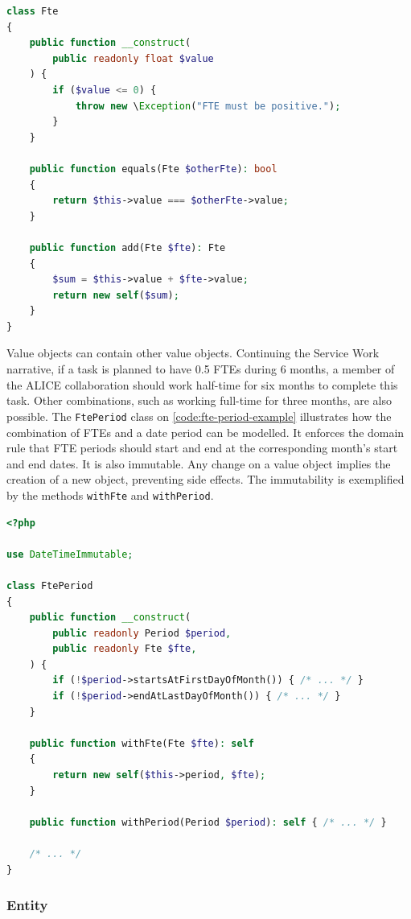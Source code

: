 \begin{lstlisting}[language=PHP,label={code:fte-example},caption={Value object to model the domain concept of FTE.}]
class Fte
{
	public function __construct(
		public readonly float $value
	) {
		if ($value <= 0) {
			throw new \Exception("FTE must be positive.");
		}		
	}

	public function equals(Fte $otherFte): bool
	{
		return $this->value === $otherFte->value;
	}

	public function add(Fte $fte): Fte
	{
		$sum = $this->value + $fte->value;
		return new self($sum);
	}
}
\end{lstlisting}

Value objects can contain other value objects. Continuing the Service Work narrative, if a task is planned to have 0.5 FTEs during 6 months, a member of the ALICE collaboration should work half-time for six months to complete this task. Other combinations, such as working full-time for three months, are also possible. The \texttt{FtePeriod} class on \autoref{code:fte-period-example} illustrates how the combination of FTEs and a date period can be modelled. It enforces the domain rule that FTE periods should start and end at the corresponding month's start and end dates. It is also immutable. Any change on a value object implies the creation of a new object, preventing side effects. The immutability is exemplified by the methods \texttt{withFte} and \texttt{withPeriod}.

\begin{lstlisting}[language=PHP,label={code:fte-period-example},caption={Value object to model the domain concept of FTE Period.}]
<?php

use DateTimeImmutable;

class FtePeriod
{
	public function __construct(
		public readonly Period $period,
		public readonly Fte $fte,
	) {
		if (!$period->startsAtFirstDayOfMonth()) { /* ... */ }
		if (!$period->endAtLastDayOfMonth()) { /* ... */ }
	}

	public function withFte(Fte $fte): self
	{
		return new self($this->period, $fte);
	}

	public function withPeriod(Period $period): self { /* ... */ }

	/* ... */
}
\end{lstlisting}

\subsubsection{Entity}

